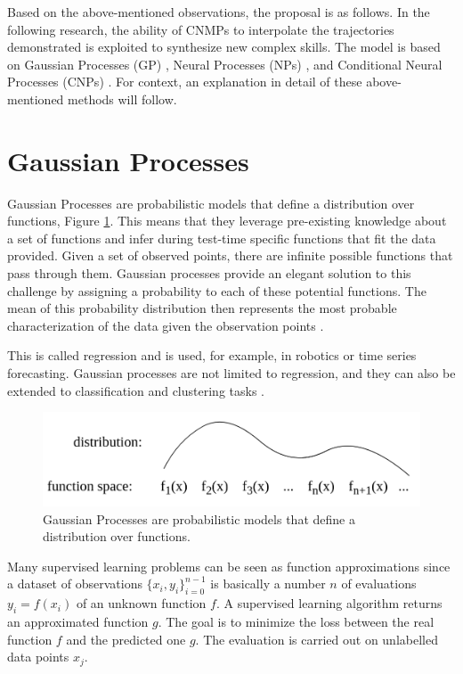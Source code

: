 Based on the above-mentioned observations, the proposal is as follows.
In the following research, the ability of CNMPs to interpolate the trajectories demonstrated is exploited to synthesize new complex skills. 
The model is based on Gaussian Processes (GP) \cite{seeger2004gaussian}, Neural Processes (NPs) \cite{garnelo2018neural}, and  Conditional Neural Processes (CNPs) \cite{DBLP:journals/corr/abs-1807-01613}.
For context, an explanation in detail of these above-mentioned methods will follow.



\section{Gaussian Processes}
Gaussian Processes \cite{seeger2004gaussian} are probabilistic models that define a distribution over functions, Figure \ref{fig:gp}.
This means that they leverage pre-existing knowledge about a set of functions and infer during test-time specific functions that fit the data provided. Given a set of observed points, there are infinite possible functions that pass through them. Gaussian processes provide an elegant solution to this challenge by assigning a probability to each of these potential functions. The mean of this probability distribution then represents the most probable characterization of the data given the observation points \cite{Goertler2018VisualExplorationGaussian}. 

This is called regression and is used, for example, in robotics or time series forecasting. Gaussian processes are not limited to regression, and they can also be extended to classification and clustering tasks \cite{kapoor2010gaussian} \cite{kim2007clustering}. 
\begin{figure}
	\centering
	\includegraphics[width=0.9\linewidth]{Images/GP.png}
	\caption{Gaussian Processes are probabilistic models that define a distribution over functions.}
	\label{fig:gp}
\end{figure}
Many supervised learning problems can be seen as function approximations since a dataset of observations $ \{x_i, y_i\}^{n-1}_{i=0}$ is basically a number $n$ of evaluations $y_i = f(x_i)$ of an unknown function $f$. A supervised learning algorithm returns an approximated function $g$. The goal is to minimize the loss between the real function $f$ and the predicted one $g$. The evaluation is carried out on unlabelled data points $x_j$.

